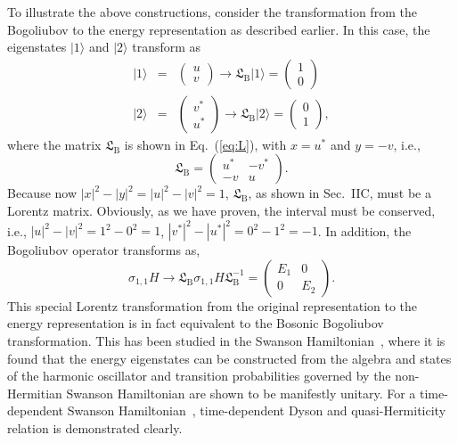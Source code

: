 \documentclass[pra,epsfig,rotate,superscriptaddress,showpacs]{revtex4}
\begin{document}
To illustrate the above constructions, consider the transformation from the Bogoliubov to the energy representation as described earlier. In this case, the eigenstates $|1\rangle$ and $|2\rangle$ transform as
\begin{eqnarray}
|1\rangle&=&\left(\begin{array}{c}u \\v\end{array} \right)\rightarrow  \mathfrak{L}_{\text {B}} |1\rangle=\left(\begin{array}{c}1 \\0\end{array} \right) \\
|2\rangle&=&\left(\begin{array}{c}v^* \\u^*\end{array} \right)\rightarrow \mathfrak{L}_{\text {B}}|2\rangle=\left(\begin{array}{c}0 \\1\end{array} \right),
\end{eqnarray}
where the matrix $\mathfrak{L}_{\text {B}}$ is shown in Eq.~(\ref{eq:L}), with $x=u^*$ and $y=-v$, i.e.,
\begin{equation}\label{eq:LB}
\mathfrak{L}_{\text {B}}=\left(\begin{array}{cc}u^*&-v^* \\ -v&u\end{array} \right).
\end{equation}
Because now $|x|^2-|y|^2=|u|^2-|v|^2=1$, $\mathfrak{L}_{\text {B}}$, as shown in Sec.~IIC, must be a Lorentz matrix. Obviously, as we have proven, the interval must be conserved, i.e., $|u|^2-|v|^2=1^2-0^2=1$, $|v^*|^2-|u^*|^2=0^2-1^2=-1$. In addition, the Bogoliubov operator transforms as,
\begin{equation}
\sigma_{1,1}H\rightarrow \mathfrak{L}_{\text {B}}\sigma_{1,1}H \mathfrak{L}_{\text {B}}^{-1}=\left(\begin{array}{cc}E_1&0 \\0&E_2\end{array} \right).
\end{equation}
This special Lorentz transformation from the original representation to the energy representation is in fact equivalent to the Bosonic Bogoliubov transformation. This has been studied in the Swanson Hamiltonian~\cite{Swanson1}, where it is found that the energy eigenstates can be constructed from the algebra and states of the harmonic oscillator and transition probabilities governed by the non-Hermitian Swanson Hamiltonian are shown to be manifestly unitary. For a time-dependent Swanson Hamiltonian~\cite{Swanson2}, time-dependent Dyson and quasi-Hermiticity relation is demonstrated clearly.
\end{document}
